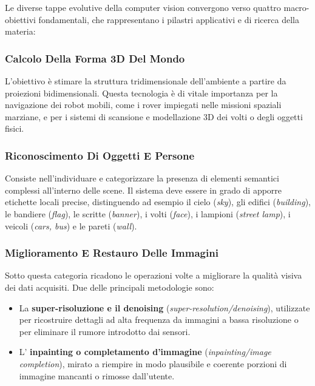 ﻿\documentclass[11pt, a4paper]{article}
\begin{document}
Le diverse tappe evolutive della computer vision convergono verso quattro macro-obiettivi fondamentali, che rappresentano i pilastri applicativi e di ricerca della materia:

\subsubsection{Calcolo Della Forma 3D Del Mondo}
L'obiettivo è stimare la struttura tridimensionale dell'ambiente a partire da proiezioni bidimensionali. Questa tecnologia è di vitale importanza per la navigazione dei robot mobili, come i rover impiegati nelle missioni spaziali marziane, e per i sistemi di scansione e modellazione 3D dei volti o degli oggetti fisici.


\subsubsection{Riconoscimento Di Oggetti E Persone}
Consiste nell'individuare e categorizzare la presenza di elementi semantici complessi all'interno delle scene. Il sistema deve essere in grado di apporre etichette locali precise, distinguendo ad esempio il cielo (\emph{sky}), gli edifici (\emph{building}), le bandiere (\emph{flag}), le scritte (\emph{banner}), i volti (\emph{face}), i lampioni (\emph{street lamp}), i veicoli (\emph{cars, bus}) e le pareti (\emph{wall}).


\subsubsection{Miglioramento E Restauro Delle Immagini}
Sotto questa categoria ricadono le operazioni volte a migliorare la qualità visiva dei dati acquisiti. Due delle principali metodologie sono:
\begin{itemize}[noitemsep]
    \item La \textbf{super-risoluzione e il denoising} (\emph{super-resolution/denoising}), utilizzate per ricostruire dettagli ad alta frequenza da immagini a bassa risoluzione o per eliminare il rumore introdotto dai sensori.
    \item L' \textbf{inpainting o completamento d'immagine} (\emph{inpainting/image completion}), mirato a riempire in modo plausibile e coerente porzioni di immagine mancanti o rimosse dall'utente.
\end{itemize}
\end{document}
